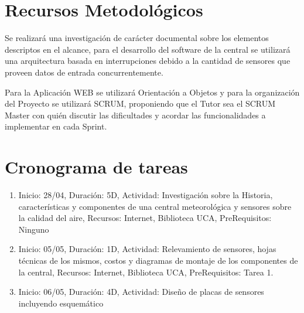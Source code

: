 \documentclass[a4paper,11pt, spanish]{article}
\begin{document}
\section{Recursos Metodológicos}
Se realizará una investigación de carácter documental sobre los elementos descriptos en el alcance, para el desarrollo del software de la central se utilizará una arquitectura basada en interrupciones debido a la cantidad de sensores que proveen datos de entrada concurrentemente.

Para la Aplicación WEB se utilizará Orientación a Objetos y para la organización del Proyecto se utilizará SCRUM, proponiendo que el Tutor sea el SCRUM Master con quién discutir las dificultades y acordar las funcionalidades a implementar en cada Sprint.  

\section{Cronograma de tareas}
\begin{enumerate}
\item Inicio: 28/04, Duración: 5D, Actividad: Investigación sobre la Historia, características y componentes de una central meteorológica y sensores sobre la calidad del aire, Recursos: Internet, Biblioteca UCA, PreRequisitos: Ninguno
\item Inicio: 05/05, Duración: 1D, Actividad: Relevamiento de sensores, hojas técnicas de los mismos, costos y diagramas de montaje de los componentes de la central, Recursos: Internet, Biblioteca UCA, PreRequisitos: Tarea 1.
\item Inicio: 06/05, Duración: 4D, Actividad: Diseño de placas de sensores incluyendo esquemático
\end{enumerate}
\end{document}
